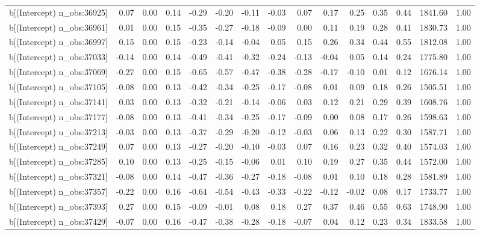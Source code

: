\begin{table}[ht]
\begin{tabular}{rrrrrrrrrrrrrrr}
  b[(Intercept) n\_obs:36925] & 0.07 & 0.00 & 0.14 & -0.29 & -0.20 & -0.11 & -0.03 & 0.07 & 0.17 & 0.25 & 0.35 & 0.44 & 1841.60 & 1.00 \\ 
  b[(Intercept) n\_obs:36961] & 0.01 & 0.00 & 0.15 & -0.35 & -0.27 & -0.18 & -0.09 & 0.00 & 0.11 & 0.19 & 0.28 & 0.41 & 1830.73 & 1.00 \\ 
  b[(Intercept) n\_obs:36997] & 0.15 & 0.00 & 0.15 & -0.23 & -0.14 & -0.04 & 0.05 & 0.15 & 0.26 & 0.34 & 0.44 & 0.55 & 1812.08 & 1.00 \\ 
  b[(Intercept) n\_obs:37033] & -0.14 & 0.00 & 0.14 & -0.49 & -0.41 & -0.32 & -0.24 & -0.13 & -0.04 & 0.05 & 0.14 & 0.24 & 1775.80 & 1.00 \\ 
  b[(Intercept) n\_obs:37069] & -0.27 & 0.00 & 0.15 & -0.65 & -0.57 & -0.47 & -0.38 & -0.28 & -0.17 & -0.10 & 0.01 & 0.12 & 1676.14 & 1.00 \\ 
  b[(Intercept) n\_obs:37105] & -0.08 & 0.00 & 0.13 & -0.42 & -0.34 & -0.25 & -0.17 & -0.08 & 0.01 & 0.09 & 0.18 & 0.26 & 1505.51 & 1.00 \\ 
  b[(Intercept) n\_obs:37141] & 0.03 & 0.00 & 0.13 & -0.32 & -0.21 & -0.14 & -0.06 & 0.03 & 0.12 & 0.21 & 0.29 & 0.39 & 1608.76 & 1.00 \\ 
  b[(Intercept) n\_obs:37177] & -0.08 & 0.00 & 0.13 & -0.41 & -0.34 & -0.25 & -0.17 & -0.09 & 0.00 & 0.08 & 0.17 & 0.26 & 1598.63 & 1.00 \\ 
  b[(Intercept) n\_obs:37213] & -0.03 & 0.00 & 0.13 & -0.37 & -0.29 & -0.20 & -0.12 & -0.03 & 0.06 & 0.13 & 0.22 & 0.30 & 1587.71 & 1.00 \\ 
  b[(Intercept) n\_obs:37249] & 0.07 & 0.00 & 0.13 & -0.27 & -0.20 & -0.10 & -0.03 & 0.07 & 0.16 & 0.23 & 0.32 & 0.40 & 1574.03 & 1.00 \\ 
  b[(Intercept) n\_obs:37285] & 0.10 & 0.00 & 0.13 & -0.25 & -0.15 & -0.06 & 0.01 & 0.10 & 0.19 & 0.27 & 0.35 & 0.44 & 1572.00 & 1.00 \\ 
  b[(Intercept) n\_obs:37321] & -0.08 & 0.00 & 0.14 & -0.47 & -0.36 & -0.27 & -0.18 & -0.08 & 0.01 & 0.10 & 0.18 & 0.28 & 1581.89 & 1.00 \\ 
  b[(Intercept) n\_obs:37357] & -0.22 & 0.00 & 0.16 & -0.64 & -0.54 & -0.43 & -0.33 & -0.22 & -0.12 & -0.02 & 0.08 & 0.17 & 1733.77 & 1.00 \\ 
  b[(Intercept) n\_obs:37393] & 0.27 & 0.00 & 0.15 & -0.09 & -0.01 & 0.08 & 0.18 & 0.27 & 0.37 & 0.46 & 0.55 & 0.63 & 1748.90 & 1.00 \\ 
  b[(Intercept) n\_obs:37429] & -0.07 & 0.00 & 0.16 & -0.47 & -0.38 & -0.28 & -0.18 & -0.07 & 0.04 & 0.12 & 0.23 & 0.34 & 1833.58 & 1.00 \\ 

\end{tabular}
\end{table}
